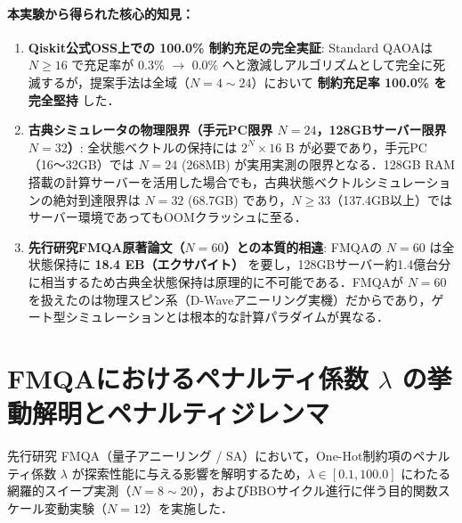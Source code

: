 \documentclass[11pt,a4paper]{ltjsarticle}
\begin{document}
\paragraph{本実験から得られた核心的知見：}
\begin{enumerate}\setlength{\itemsep}{1.5pt}
    \item \textbf{Qiskit公式OSS上での 100.0\% 制約充足の完全実証}:
    Standard QAOAは $N \ge 16$ で充足率が 0.3\% $\to$ 0.0\% へと激減しアルゴリズムとして完全に死滅するが，提案手法は全域（$N=4 \sim 24$）において \textbf{制約充足率 100.0\% を完全堅持} した．
    \item \textbf{古典シミュレータの物理限界（手元PC限界 $N=24$，128GBサーバー限界 $N=32$）}:
    全状態ベクトルの保持には $2^N \times 16\text{ B}$ が必要であり，手元PC（16〜32GB）では $N=24$ (268MB) が実用実測の限界となる．128GB RAM搭載の計算サーバーを活用した場合でも，古典状態ベクトルシミュレーションの絶対到達限界は $N=32$ (68.7GB) であり，$N \ge 33$（137.4GB以上）ではサーバー環境であってもOOMクラッシュに至る．
    \item \textbf{先行研究FMQA原著論文（$N=60$）との本質的相違}:
    FMQAの $N=60$ は全状態保持に \textbf{18.4 EB（エクサバイト）} を要し，128GBサーバー約1.4億台分に相当するため古典全状態保持は原理的に不可能である．FMQAが $N=60$ を扱えたのは物理スピン系（D-Waveアニーリング実機）だからであり，ゲート型シミュレーションとは根本的な計算パラダイムが異なる．
\end{enumerate}

\clearpage

\section{FMQAにおけるペナルティ係数 $\lambda$ の挙動解明とペナルティジレンマ}
\label{sec:result_lambda}

先行研究 FMQA（量子アニーリング / SA）において，One-Hot制約項のペナルティ係数 $\lambda$ が探索性能に与える影響を解明するため，$\lambda \in [0.1, 100.0]$ にわたる網羅的スイープ実測（$N=8 \sim 20$），およびBBOサイクル進行に伴う目的関数スケール変動実験（$N=12$）を実施した．
\end{document}
